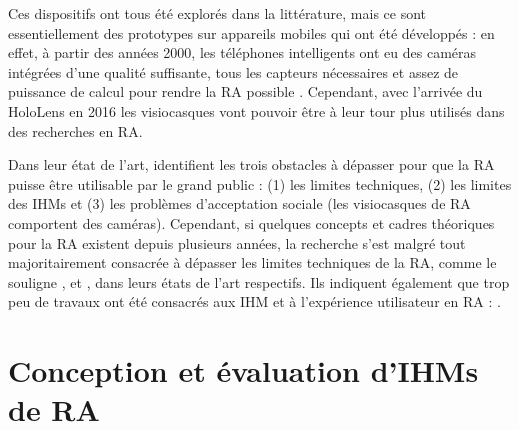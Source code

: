 



Ces dispositifs ont tous été explorés dans la littérature, mais ce sont essentiellement des prototypes sur appareils mobiles qui ont été développés : en effet, à partir des années 2000, les téléphones intelligents ont eu des caméras intégrées d'une qualité suffisante, tous les capteurs nécessaires et assez de puissance de calcul pour rendre la RA possible \citep{Huang2013}. Cependant, avec l'arrivée du HoloLens en 2016 les visiocasques vont pouvoir être à leur tour plus utilisés dans des recherches en RA.

Dans leur état de l'art, \cite{Azuma2001} identifient les trois obstacles à dépasser pour que la RA puisse être utilisable par le grand public : (1) les limites techniques, (2) les limites des IHMs et (3) les problèmes d'acceptation sociale (les visiocasques de RA comportent des caméras). Cependant, si quelques concepts et cadres théoriques pour la RA existent depuis plusieurs années, la recherche s'est malgré tout majoritairement consacrée à dépasser les limites techniques de la RA, comme le souligne \cite{Zhou2008}, \cite{VanKrevelen2010} et \cite{Billinghurst2015}, dans leurs états de l'art respectifs. Ils indiquent également que trop peu de travaux ont été consacrés aux IHM et à l'expérience utilisateur en RA :  \citep{Billinghurst2015}.


\section{Conception et évaluation d'IHMs de RA}
\label{sec:litterature_ar_hci}

